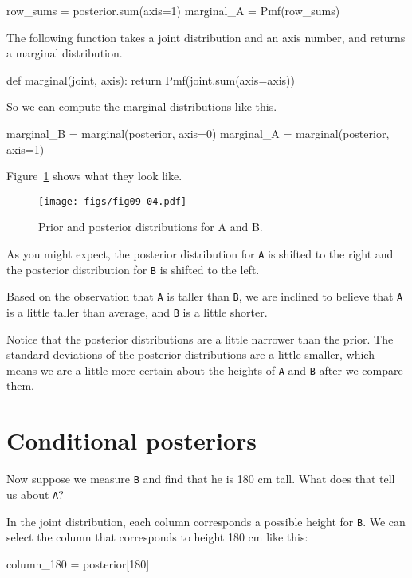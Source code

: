 \documentclass[12pt]{book}
\theoremstyle{exercise}
\newcommand{\py}[1]{{\tt #1}}%
\begin{document}
\begin{code}
row_sums = posterior.sum(axis=1)
marginal_A = Pmf(row_sums)
\end{code}

The following function takes a joint distribution and an axis number, and returns a marginal distribution.

\begin{code}
def marginal(joint, axis):
    return Pmf(joint.sum(axis=axis))
\end{code}

So we can compute the marginal distributions like this.

\begin{code}
marginal_B = marginal(posterior, axis=0)
marginal_A = marginal(posterior, axis=1)
\end{code}

Figure~\ref{fig09-04} shows what they look like.

\begin{figure}
\centerline{\texttt{[image: figs/fig09-04.pdf]}}
\caption{Prior and posterior distributions for A and B.}
\label{fig09-04}
\end{figure}

As you might expect, the posterior distribution for \py{A} is shifted to the right and the posterior distribution for \py{B} is shifted to the left.

Based on the observation that \py{A} is taller than \py{B}, we are inclined to believe that \py{A} is a little taller than average, and \py{B} is a little shorter.

Notice that the posterior distributions are a little narrower than the prior.
The standard deviations of the posterior distributions are a little smaller, which means we are a little more certain about the heights of \py{A} and \py{B} after we compare them.


\section{Conditional posteriors}

Now suppose we measure \py{B} and find that he is 180 cm tall.  What does that tell us about \py{A}?

In the joint distribution, each column corresponds a possible height for \py{B}.  We can select the column that corresponds to height 180 cm like this:

\begin{code}
column_180 = posterior[180]
\end{code}
\end{document}
